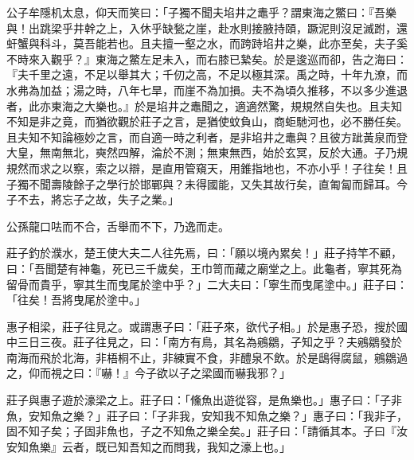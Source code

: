 \begin{pinyinscope}
公子牟隱机太息，仰天而笑曰：「子獨不聞夫埳井之鼃乎？謂東海之鱉曰：『吾樂與！出跳梁乎井幹之上，入休乎缺甃之崖，赴水則接腋持頤，蹶泥則沒足滅跗，還虷蟹與科斗，莫吾能若也。且夫擅一壑之水，而跨跱埳井之樂，此亦至矣，夫子奚不時來入觀乎？』東海之鱉左足未入，而右膝已縶矣。於是逡巡而卻，告之海曰：『夫千里之遠，不足以舉其大；千仞之高，不足以極其深。禹之時，十年九潦，而水弗為加益；湯之時，八年七旱，而崖不為加損。夫不為頃久推移，不以多少進退者，此亦東海之大樂也。』於是埳井之鼃聞之，適適然驚，規規然自失也。且夫知不知是非之竟，而猶欲觀於莊子之言，是猶使蚊負山，商蚷馳河也，必不勝任矣。且夫知不知論極妙之言，而自適一時之利者，是非埳井之鼃與？且彼方跐黃泉而登大皇，無南無北，奭然四解，淪於不測；無東無西，始於玄冥，反於大通。子乃規規然而求之以察，索之以辯，是直用管窺天，用錐指地也，不亦小乎！子往矣！且子獨不聞壽陵餘子之學行於邯鄲與？未得國能，又失其故行矣，直匍匐而歸耳。今子不去，將忘子之故，失子之業。」

公孫龍口呿而不合，舌舉而不下，乃逸而走。

莊子釣於濮水，楚王使大夫二人往先焉，曰：「願以境內累矣！」莊子持竿不顧，曰：「吾聞楚有神龜，死已三千歲矣，王巾笥而藏之廟堂之上。此龜者，寧其死為留骨而貴乎，寧其生而曳尾於塗中乎？」二大夫曰：「寧生而曳尾塗中。」莊子曰：「往矣！吾將曳尾於塗中。」

惠子相梁，莊子往見之。或謂惠子曰：「莊子來，欲代子相。」於是惠子恐，搜於國中三日三夜。莊子往見之，曰：「南方有鳥，其名為鵷鶵，子知之乎？夫鵷鶵發於南海而飛於北海，非梧桐不止，非練實不食，非醴泉不飲。於是鴟得腐鼠，鵷鶵過之，仰而視之曰：『嚇！』今子欲以子之梁國而嚇我邪？」

莊子與惠子遊於濠梁之上。莊子曰：「儵魚出遊從容，是魚樂也。」惠子曰：「子非魚，安知魚之樂？」莊子曰：「子非我，安知我不知魚之樂？」惠子曰：「我非子，固不知子矣；子固非魚也，子之不知魚之樂全矣。」莊子曰：「請循其本。子曰『汝安知魚樂』云者，既已知吾知之而問我，我知之濠上也。」


\end{pinyinscope}